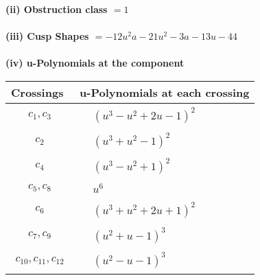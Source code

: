 \documentclass[1p]{elsarticle_modified}
\theoremstyle{definition}
\begin{document}
\flushleft \textbf{(ii) Obstruction class $= 1$}\\~\\
\flushleft \textbf{(iii) Cusp Shapes $= -12 u^2 a-21 u^2-3 a-13 u-44$}\\~\\
\newpage\renewcommand{\arraystretch}{1}
\flushleft \textbf{(iv) u-Polynomials at the component}\newline \\
\begin{tabular}{m{50pt}|m{274pt}}
Crossings & \hspace{64pt}u-Polynomials at each crossing \\
\hline $$\begin{aligned}c_{1},c_{3}\end{aligned}$$&$\begin{aligned}
&(u^3- u^2+2 u-1)^2
\end{aligned}$\\
\hline $$\begin{aligned}c_{2}\end{aligned}$$&$\begin{aligned}
&(u^3+u^2-1)^2
\end{aligned}$\\
\hline $$\begin{aligned}c_{4}\end{aligned}$$&$\begin{aligned}
&(u^3- u^2+1)^2
\end{aligned}$\\
\hline $$\begin{aligned}c_{5},c_{8}\end{aligned}$$&$\begin{aligned}
&u^6
\end{aligned}$\\
\hline $$\begin{aligned}c_{6}\end{aligned}$$&$\begin{aligned}
&(u^3+u^2+2 u+1)^2
\end{aligned}$\\
\hline $$\begin{aligned}c_{7},c_{9}\end{aligned}$$&$\begin{aligned}
&(u^2+u-1)^3
\end{aligned}$\\
\hline $$\begin{aligned}c_{10},c_{11},c_{12}\end{aligned}$$&$\begin{aligned}
&(u^2- u-1)^3
\end{aligned}$\\
\hline
\end{tabular}\\~\\
\end{document}
